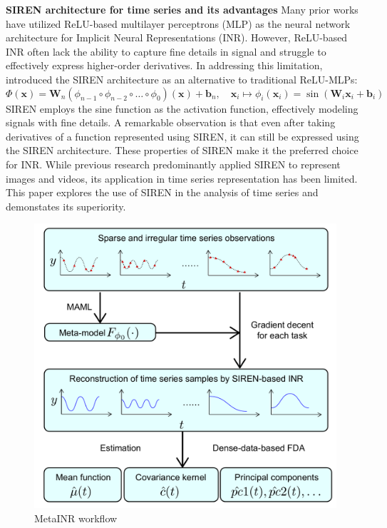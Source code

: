 \documentclass{article}
\begin{document}
\textbf{SIREN architecture for time series and its advantages}
Many prior works have utilized ReLU-based multilayer perceptrons (MLP) as the neural network architecture for Implicit Neural Representations (INR). 
However, ReLU-based INR often lack the ability to capture fine details in signal and struggle to effectively express higher-order derivatives.
In addressing this limitation, \cite{sitzmann2020implicit} introduced the SIREN architecture as an alternative to traditional ReLU-MLPs:
$$
\Phi(\mathbf{x})=\mathbf{W}_n\left(\phi_{n-1} \circ \phi_{n-2} \circ \ldots \circ \phi_0\right)(\mathbf{x})+\mathbf{b}_n, \quad \mathbf{x}_i \mapsto \phi_i\left(\mathbf{x}_i\right)=\sin \left(\mathbf{W}_i \mathbf{x}_i+\mathbf{b}_i\right)
$$
SIREN employs the sine function as the activation function, effectively modeling signals with fine details.
A remarkable observation is that even after taking derivatives of a function represented using SIREN, 
it can still be expressed using the SIREN architecture. 
These properties of SIREN make it the preferred choice for INR.
While previous research predominantly applied SIREN to represent images and videos, its application in time series representation has been limited. 
This paper explores the use of SIREN in the analysis of time series and demonstates its superiority.

\begin{figure}
  \centering
  \includegraphics[width=\textwidth]{illustration.pdf}
  \caption{MetaINR workflow}
  \label{MetaINR workflow}
\end{figure}
\end{document}
